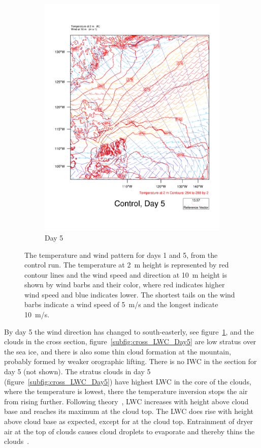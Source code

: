 \begin{figure}
\begin{subfigure}{0.48\textwidth}
        \includegraphics[width=\textwidth]{results/control/T2UV10_Control_Day5.pdf}
        \caption{Day 5}
        \label{subfig:weather_cont_day5}
    \end{subfigure}
    \caption{The temperature and wind pattern for days 1 and 5, from the control run. The temperature at 2~m height is represented by red contour lines and the wind speed and direction at 10~m height is shown by wind barbs and their color, where red indicates higher wind speed and blue indicates lower. The shortest tails on the wind barbs indicate a wind speed of 5~m/s and the longest indicate 10~m/s.}
    \label{fig:weather}
\end{figure}

By day 5 the wind direction has changed to south-easterly, see figure~\ref{subfig:weather_cont_day5}, and the clouds in the cross section, figure~\ref{subfig:cross_LWC_Day5} are low stratus over the sea ice, and there is also some thin cloud formation at the mountain, probably formed by weaker orographic lifting. There is no IWC in the section for day 5 (not shown). The stratus clouds in day 5 (figure~\ref{subfig:cross_LWC_Day5}) have highest LWC in the core of the clouds, where the temperature is lowest, there the temperature inversion stops the air from rising further. Following theory~\citep{Rogers1989}, LWC increases with height above cloud base and reaches its maximum at the cloud top. The LWC does rise with height above cloud base as expected, except for at the cloud top. Entrainment of dryer air at the top of clouds causes cloud droplets to evaporate and thereby thins the clouds~\citep{Wallace2006}.


